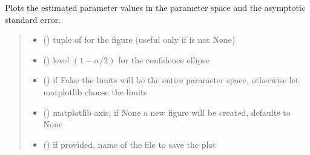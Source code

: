 \documentclass[letterpaper,10pt,english]{sphinxmanual}
\begin{document}
\begin{fulllineitems}
\begin{fulllineitems}
\label{\detokenize{cubmods:cubmods.cush.CUBresCUSH.plot_estim}}
\pysigstartsignatures
{}
\pysigstopsignatures
\sphinxAtStartPar
Plots the estimated parameter values in the parameter space and
the asymptotic standard error.
\begin{quote}\begin{description}
\begin{itemize}
\item {} 
\sphinxAtStartPar
{} () \textendash{} tuple of  for the figure (useful only if  is not None)

\item {} 
\sphinxAtStartPar
{} () \textendash{} level \((1-\alpha/2)\) for the confidence ellipse

\item {} 
\sphinxAtStartPar
{} () \textendash{} if False the limits will be the entire parameter space, otherwise let matplotlib choose the limits

\item {} 
\sphinxAtStartPar
{} (\sphinxstyleliteralemphasis{\sphinxupquote{, }}) \textendash{} matplotlib axis, if None a new figure will be created, defaults to None

\item {} 
\sphinxAtStartPar
{} () \textendash{} if provided, name of the file to save the plot


\end{itemize}
\end{description}
\end{quote}
\end{fulllineitems}
\end{fulllineitems}
\end{document}
